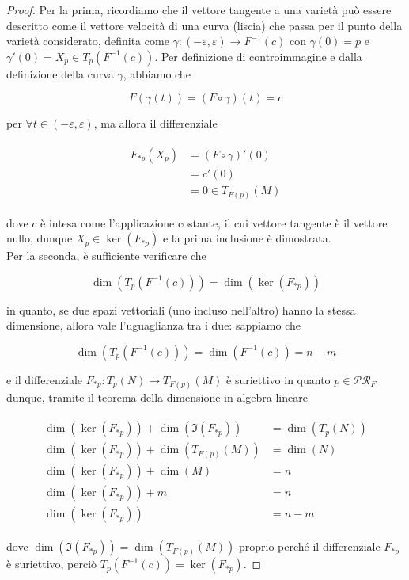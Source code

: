 \begin{proof}
	Per la prima, ricordiamo che il vettore tangente a una varietà può essere descritto come il vettore velocità di una curva (liscia) che passa per il punto della varietà considerato, definita come $ \gamma : (-\varepsilon,\varepsilon) \to F^{-1}(c) $ con $ \gamma(0) = p $ e $ \gamma'(0) = X_{p} \in T_{p}(F^{-1}(c)) $. Per definizione di controimmagine e dalla definizione della curva $ \gamma $, abbiamo che
	
	\begin{equation}
		F(\gamma(t)) = (F \circ \gamma)(t) = c
	\end{equation}
	
	per $ \forall t \in (-\varepsilon,\varepsilon) $, ma allora il differenziale
	
	\begin{align}
		\begin{split}
			F_{*p}(X_{p}) &= (F \circ \gamma)'(0)\\
			&= c'(0)\\
			&= 0 \in T_{F(p)}(M)
		\end{split}
	\end{align}

	dove $ c $ è intesa come l'applicazione costante, il cui vettore tangente è il vettore nullo, dunque $ X_{p} \in \ker(F_{*p}) $ e la prima inclusione è dimostrata.\\
	Per la seconda, è sufficiente verificare che
	
	\begin{equation}
		\dim(T_{p}(F^{-1}(c))) = \dim(\ker(F_{*p}))
	\end{equation}

	in quanto, se due spazi vettoriali (uno incluso nell'altro) hanno la stessa dimensione, allora vale l'uguaglianza tra i due: sappiamo che
	
	\begin{equation}
		\dim(T_{p}(F^{-1}(c))) = \dim(F^{-1}(c)) = n-m
	\end{equation}

	e il differenziale $ F_{*p} : T_{p}(N) \to T_{F(p)}(M) $ è suriettivo in quanto $ p \in \mathcal{PR}_{F} $ dunque, tramite il teorema della dimensione in algebra lineare
	
	\begin{align}
		\begin{split}
			\dim(\ker(F_{*p})) + \dim(\Im(F_{*p})) &= \dim(T_{p}(N))\\
			\dim(\ker(F_{*p})) + \dim(T_{F(p)}(M)) &= \dim(N)\\
			\dim(\ker(F_{*p})) + \dim(M) &= n\\
			\dim(\ker(F_{*p})) + m &= n\\
			\dim(\ker(F_{*p})) &= n-m
		\end{split}		
	\end{align}

	dove $ \dim(\Im(F_{*p})) = \dim(T_{F(p)}(M)) $ proprio perché il differenziale $ F_{*p} $ è suriettivo, perciò $ T_{p}(F^{-1}(c)) = \ker(F_{*p}) $.
\end{proof}

